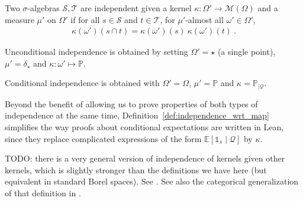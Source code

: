 \begin{definition}\label{def:independence_wrt_map}
Two $\sigma$-algebras $\mathcal S, \mathcal T$ are independent given a kernel $\kappa : \Omega' \to \mathcal M(\Omega)$ and a measure $\mu'$ on $\Omega'$ if for all $s \in \mathcal S$ and $t \in \mathcal T$, for $\mu'$-almost all $\omega' \in \Omega'$,
\begin{align*}
\kappa (\omega') (s \cap t) = \kappa (\omega') (s) \: \kappa (\omega') (t)
\: .
\end{align*}
\end{definition}

Unconditional independence is obtained by setting $\Omega' = \star$ (a single point), $\mu' = \delta_\star$ and $\kappa : \omega' \mapsto \mathbb{P}$.

Conditional independence is obtained with $\Omega' = \Omega$, $\mu' = \mathbb{P}$ and $\kappa = \mathbb{P}_{| \mathcal Q}$.

Beyond the benefit of allowing us to prove properties of both types of independence at the same time, Definition~\ref{def:independence_wrt_map} simplifies the way proofs about conditional expectations are written in Lean, since they replace complicated expressions of the form $\mathbb{E}[\mathbb{1}_{s} \mid \mathcal Q]$ by $\kappa$.

TODO: there is a very general version of independence of kernels given other kernels, which is slightly stronger than the definitions we have here (but equivalent in standard Borel spaces). See \cite{forre2021transitional}.
See also the categorical generalization of that definition in \cite{fritz2023d}.